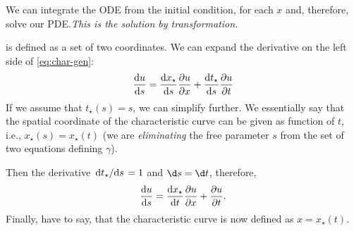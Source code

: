 \documentclass[justified, nobib, a4page]{tufte-handout}
\begin{document}
\begin{marginfigure}
	\begin{center}
	\end{center}
	\caption{The characteristic curve \(\gamma\) plotted in the \(x\)-\(t\) coordinate
		system along with the initial condition \(u_0(x)\). The arrows denote integration
		direction along the ODE defined on \(\gamma\).}\label{fig:ch1}
\end{marginfigure}

We can integrate the ODE from the initial condition, for each \(x\) and, therefore,
solve our PDE.\@ \emph{This is the solution by transformation.}

 is defined as a set of two coordinates. We can
expand the derivative on the left side of \cref{eq:char-gen}:
\[
	\odv{u}{s} = \odv{x_\star}{s}\pdv{u}{x} + \odv{t_\star}{s}\pdv{u}{t}
\]
If we assume that \(t_\star(s) = s\), we can simplify further. We essentially
say that the spatial coordinate of the characteristic curve can be given as
function of \(t\), i.e., \(x_\star(s) = x_\star(t)\) (we are \emph{eliminating}
the free parameter \(s\) from the set of two equations defining \(\gamma\)).

Then the derivative \(\odv{t_\star}/{s} = 1\) and \(\d s = \d t\), therefore,
\begin{equation}
	\odv{u}{s} = \odv{x_\star}{t}\pdv{u}{x} + \pdv{u}{t}.
	\label{eq:duds}
\end{equation}
Finally, have to say, that the characteristic curve is now defined as
\(x=x_\star(t)\).
\end{document}
